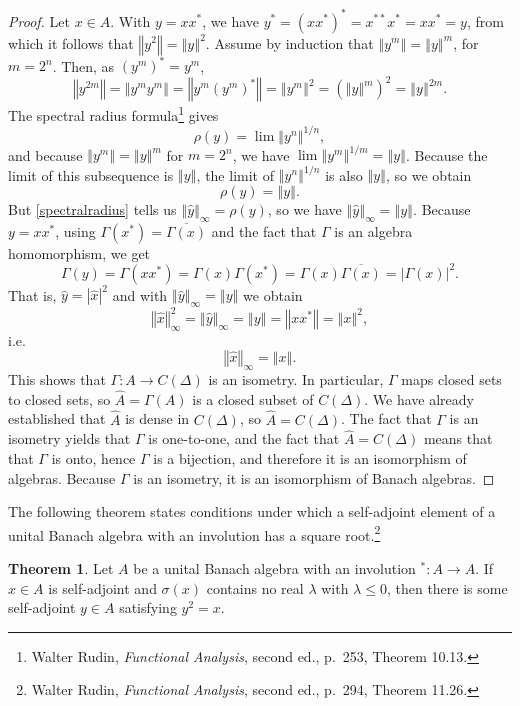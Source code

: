 \documentclass{article}
\newcommand{\norm}[1]{\left\Vert #1 \right\Vert}
\theoremstyle{definition}
\newtheorem{theorem}{Theorem}
\theoremstyle{definition}
\begin{document}
\begin{proof}
Let $x \in A$. With $y=xx^*$, we have $y^*=(xx^*)^*=x^{**}x^*=xx^*=y$, from which it follows that $\norm{y^2}=\norm{y}^2$. 
Assume by induction that $\norm{y^m}=\norm{y}^m$, for $m=2^n$. Then, as $(y^m)^*=y^m$,
\[
\norm{y^{2m}} = \norm{y^m y^m}= \norm{y^m (y^m)^*} = \norm{y^m}^2 = (\norm{y}^m)^2 = \norm{y}^{2m}.
\]
The spectral radius formula\footnote{Walter Rudin, {\em Functional Analysis}, second ed., p.~253, Theorem 10.13.}
gives
\[
\rho(y) = \lim \norm{y^n}^{1/n},
\]
and because $\norm{y^m}=\norm{y}^m$ for $m=2^n$, we have $\lim \norm{y^m}^{1/m} = \norm{y}$. Because the limit of this subsequence
is $\norm{y}$, the limit of $\norm{y^n}^{1/n}$ is also $\norm{y}$, so we obtain
\[
\rho(y)=\norm{y}.
\]
But \eqref{spectralradius} tells us $\norm{\hat{y}}_\infty=\rho(y)$, so we have
$\norm{\hat{y}}_\infty=\norm{y}$.
Because $y=xx^*$, using $\Gamma(x^*)=\overline{\Gamma(x)}$ and the fact that $\Gamma$ is an algebra homomorphism, we get 
\[
\Gamma(y)=\Gamma(xx^*)=\Gamma(x)\Gamma(x^*)=\Gamma(x)\overline{\Gamma(x)}=|\Gamma(x)|^2.
\]
That is, $\hat{y}=|\hat{x}|^2$ and with $\norm{\hat{y}}_\infty=\norm{y}$ we obtain
\[
\norm{\hat{x}}_\infty^2 = \norm{\hat{y}}_\infty = \norm{y} = \norm{xx^*} = \norm{x}^2,
\] 
i.e.
\[
\norm{\hat{x}}_\infty = \norm{x}.
\]
 This shows that
$\Gamma:A \to C(\Delta)$ is an isometry. In particular, $\Gamma$ maps closed sets to closed sets,
so $\widehat{A}=\Gamma(A)$ is a closed subset of $C(\Delta)$. We have already established that
$\widehat{A}$ is dense in $C(\Delta)$, so $\widehat{A}=C(\Delta)$. The fact that 
$\Gamma$ is an isometry yields that $\Gamma$ is one-to-one, and the fact that
$\widehat{A}=C(\Delta)$ means that
that $\Gamma$ is onto, hence $\Gamma$ is a bijection, and therefore it is an isomorphism of algebras. Because
$\Gamma$ is an isometry, it is an isomorphism of Banach algebras.
\end{proof}


The following theorem states conditions under which a self-adjoint element of a  
unital Banach algebra with an involution has a square root.\footnote{Walter Rudin, {\em Functional Analysis}, second ed., p.~294, Theorem 11.26.}


\begin{theorem}
Let $A$ be a  unital Banach algebra with an involution $^*:A \to A$. If $x \in A$ is self-adjoint
and $\sigma(x)$ contains no real $\lambda$ with $\lambda \leq 0$, then there is some self-adjoint $y \in A$ satisfying
$y^2=x$.
\label{squareroot}
\end{theorem}
\end{document}
